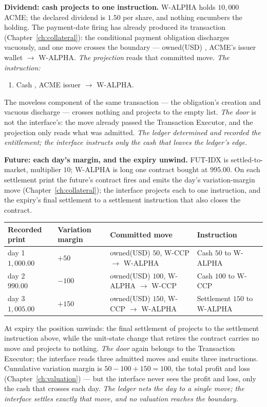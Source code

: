 \textbf{Dividend: cash projects to one instruction.} W-ALPHA holds $10{,}000$ ACME;
the declared dividend is $1.50$ per share, and nothing encumbers the holding. The
payment-date firing has already produced its transaction
(Chapter~\ref{ch:collateral}): the conditional payment obligation discharges
vacuously, and one move crosses the boundary --- owned(USD) , ACME's
issuer wallet $\to$ W-ALPHA.
\emph{The projection} reads that committed move.
\emph{The instruction:}
\begin{enumerate}[label=(\arabic*),nosep]
\item Cash , ACME issuer $\to$ W-ALPHA.
\end{enumerate}
The moveless component of the same transaction --- the obligation's creation and
vacuous discharge --- crosses nothing and projects to the empty list.
\emph{The door} is not the interface's: the move already passed the Transaction
Executor, and the projection only reads what was admitted.
\emph{The ledger determined and recorded the entitlement; the interface instructs
only the cash that leaves the ledger's edge.}

\medskip\noindent\textbf{Future: each day's margin, and the expiry unwind.} FUT-IDX
is settled-to-market, multiplier $10$; W-ALPHA is long one contract bought at
$995.00$. On each settlement print the future's contract fires and emits the day's
variation-margin move (Chapter~\ref{ch:collateral}); the interface projects each to
one instruction, and the expiry's final settlement to a settlement instruction that
also closes the contract.

\begin{center}
\begin{tabular}{@{}llll@{}}
\toprule
Recorded print & Variation margin & Committed move & Instruction \\
\midrule
day 1 \ $1{,}000.00$ & $+50$ & owned(USD) $50$, W-CCP $\to$ W-ALPHA & Cash $50$ to W-ALPHA \\
day 2 \ $990.00$ & $-100$ & owned(USD) $100$, W-ALPHA $\to$ W-CCP & Cash $100$ to W-CCP \\
day 3 \ $1{,}005.00$ & $+150$ & owned(USD) $150$, W-CCP $\to$ W-ALPHA & Settlement $150$ to W-ALPHA \\
\bottomrule
\end{tabular}
\end{center}

\noindent At expiry the position unwinds: the final settlement of 
projects to the settlement instruction above, while the unit-state change that
retires the contract carries no move and projects to nothing.
\emph{The door} again belongs to the Transaction Executor; the interface reads
three admitted moves and emits three instructions.
Cumulative variation margin is $50-100+150 = 100$, the total profit and loss
(Chapter~\ref{ch:valuation}) --- but the interface never sees the profit and loss,
only the cash that crosses each day.
\emph{The ledger nets the day to a single move; the interface settles exactly that
move, and no valuation reaches the boundary.}

